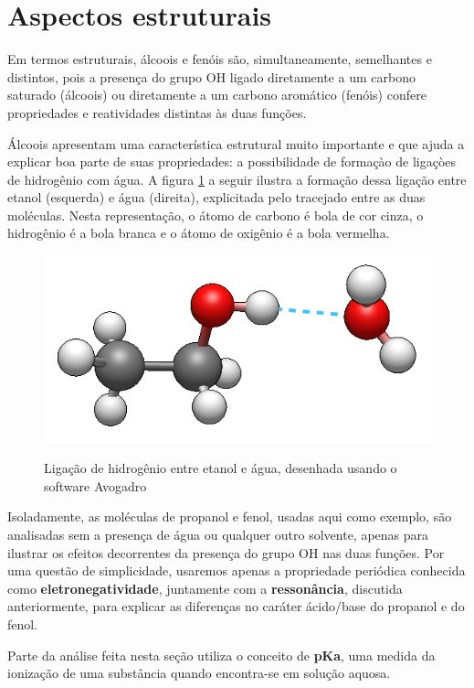 \section{Aspectos estruturais}
Em termos estruturais, álcoois e fenóis são, simultaneamente, semelhantes e distintos, pois a presença do grupo OH ligado diretamente a um carbono saturado (álcoois) ou diretamente a um carbono aromático (fenóis) confere propriedades e reatividades distintas às duas funções.

Álcoois apresentam uma característica estrutural muito importante e que ajuda a explicar boa parte de suas propriedades: a possibilidade de formaçào de ligaçòes de hidrogênio com água. A figura \ref{fig:ligacaoh} a seguir ilustra a formação dessa ligação entre etanol (esquerda) e água (direita), explicitada pelo tracejado entre as duas moléculas. Nesta representação, o átomo de carbono é bola de cor cinza, o hidrogênio é a bola branca e o átomo de oxigênio é a bola vermelha.

 \begin{figure}[h]
	\centering
	\caption{Ligação de hidrogênio entre etanol e água, desenhada usando o software Avogadro \cite{avogadro}}
	\vspace{0.5cm}
	\includegraphics[width=0.85\linewidth]{imagens/ligacaoh.png}
	\label{fig:ligacaoh}
\end{figure}

Isoladamente, as moléculas de propanol e fenol, usadas aqui como exemplo, são analisadas sem a presença de água ou qualquer outro solvente, apenas para ilustrar os efeitos decorrentes da presença do grupo OH nas duas funções. Por uma questão de simplicidade, usaremos apenas a propriedade periódica conhecida como \textbf{eletronegatividade}, juntamente com a \textbf{ressonância}, discutida anteriormente, para explicar as diferenças no caráter ácido/base do propanol e do fenol.

Parte da análise feita nesta seção utiliza o conceito de \textbf{pKa}, uma medida da ionização de uma substância quando encontra-se em solução aquosa.

